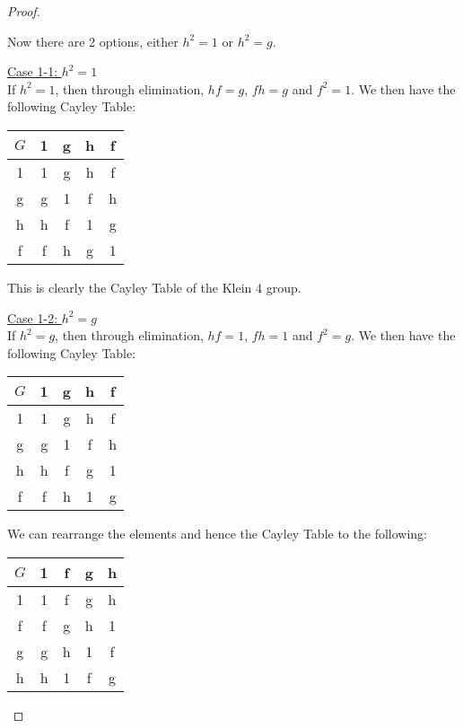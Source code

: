 \begin{proof}
\begin{enumerate}
          Now there are 2 options, either $h^2 = 1$ or $h^2 = g$.

          \underline{Case 1-1: $h^2 = 1$} \\
          If $h^2 = 1$, then through elimination, $hf = g$, $fh = g$ and $f^2 = 1$. We then have the following Cayley Table:
          
          \begin{center}
            \begin{tabular}{c|c|c|c|c}
              $G$   & 1 & g & h & f \\
              \hline
              1     & 1 & g & h & f \\
              g     & g & 1 & f & h \\
              h     & h & f & 1 & g \\
              f     & f & h & g & 1
            \end{tabular}
          \end{center}

          This is clearly the Cayley Table of the Klein $4$ group.

          \underline{Case 1-2: $h^2 = g$} \\
          If $h^2 = g$, then through elimination, $hf = 1$, $fh = 1$ and $f^2 = g$. We then have the following Cayley Table:

          \begin{center}
            \begin{tabular}{c|c|c|c|c}
              $G$   & 1 & g & h & f \\
              \hline
              1     & 1 & g & h & f \\
              g     & g & 1 & f & h \\
              h     & h & f & g & 1 \\
              f     & f & h & 1 & g
            \end{tabular}
          \end{center}

          We can rearrange the elements and hence the Cayley Table to the following:

          \begin{center}
            \begin{tabular}{c|c|c|c|c}
              $G$   & 1 & f & g & h \\
              \hline
              1     & 1 & f & g & h \\
              f     & f & g & h & 1 \\
              g     & g & h & 1 & f \\
              h     & h & 1 & f & g
            \end{tabular}
          \end{center}


\end{enumerate}
\end{proof}
